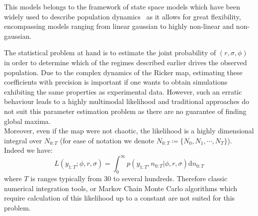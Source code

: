 \documentclass[12pt]{article}
\begin{document}
	This models belongs to the framework of state space models which have been widely used to describe population dynamics~\cite{lillegaard2008estimation, zhang2009spatial, zhang2010computational} as it allows for great flexibility, encompassing models ranging from linear gaussian to highly non-linear and non-gaussian. 
	
	The statistical problem at hand is to estimate the joint probability of $(r, \sigma, \phi)$ in order to determine which of the regimes described earlier drives the observed population. Due to the complex dynamics of the Ricker map, estimating these coefficients with precision is important if one wants to obtain simulations exhibiting the same properties as experimental data. However, such an erratic behaviour leads to a highly multimodal likelihood and traditional approaches do not suit this parameter estimation problem as there are no guarantee of finding global maxima. \\
	Moreover, even if the map were not chaotic, the likelihood is a highly dimensional integral over $N_{0:T}$ (for ease of notation we denote $N_{0:T} \coloneqq \{N_0, N_1, \cdots, N_T\}$). Indeed we have:
	\begin{equation}
	L(y_{1:T}; \phi, r, \sigma) = \int_{0}^{\infty}p(y_{1:T}, n_{0:T} | \phi, r, \sigma)\mathrm{d}n_{0:T}
	\end{equation}
	where $T$ is ranges typically from 30 to several hundreds. Therefore classic numerical integration tools, or Markov Chain Monte Carlo algorithms which require calculation of this likelihood up to a constant are not suited for this problem. 
	
\end{document}
